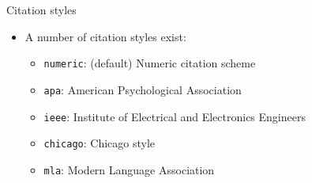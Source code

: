 \documentclass[,aspectratio=43]{beamer}
\providecommand{\tightlist}{%
  \setlength{\itemsep}{0pt}\setlength{\parskip}{0pt}}
\begin{document}
\begin{frame}[fragile]{Citation styles}
\vspace{0.5em}

\begin{itemize}
\item
  A number of citation styles exist:

  \begin{itemize}
  \tightlist
  \item
    \texttt{numeric}: (default) Numeric citation scheme
  \item
    \texttt{apa}: American Psychological Association
  \item
    \texttt{ieee}: Institute of Electrical and Electronics Engineers
  \item
    \texttt{chicago}: Chicago style
  \item
    \texttt{mla}: Modern Language Association
  \end{itemize}
\end{itemize}
\end{frame}
\end{document}
